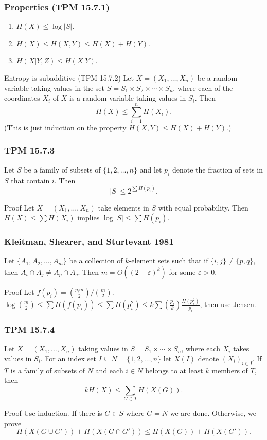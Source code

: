 \documentclass{beamer}
\newcommand{\lp}{\left(}
\newcommand{\rp}{\right)}
\begin{document}
\begin{frame}
  \frametitle{Properties (TPM 15.7.1)}
  \begin{enumerate}
    \item $H(X) \le \log |S|$. \pause
    \item $H(X) \le H(X, Y) \le H(X) + H(Y)$. \pause
    \item $H(X|Y, Z) \le H(X|Y)$. \pause
  \end{enumerate}

  \begin{block}{Entropy is subadditive (TPM 15.7.2)}
    Let $X = (X_1, \dotsc, X_n)$ be a random variable taking values in the set $S = S_1 \times S_2 \times \dotsb \times S_n$, where each of the coordinates $X_i$ of $X$ is a random variable taking values in $S_i$. Then \[ H(X) \le \sum_{i = 1}^n H(X_i). \] \pause (This is just induction on the property $H(X, Y) \le H(X) + H(Y)$.)
  \end{block}
\end{frame}

\begin{frame}
  \frametitle{TPM 15.7.3}
  Let $S$ be a family of subsets of $\{ 1, 2, \dotsc, n \}$ and let $p_i$ denote the fraction of sets in $S$ that contain $i$. Then \[ |S| \le 2^{\sum H(p_i)}. \] \pause

  \begin{block}{Proof}
    Let $X = (X_1, \dotsc, X_n)$ take elements in $S$ with equal probability. Then $H(X) \le \sum H(X_i)$ implies $\log |S| \le \sum H(p_i)$.
  \end{block}
\end{frame}

\begin{frame}
  \frametitle{Kleitman, Shearer, and Sturtevant 1981}
  Let $\{ A_1, A_2, \dotsc, A_m \}$ be a collection of $k$-element sets such that if $\{ i, j \} \ne \{ p, q \}$, then $A_i \cap A_j \ne A_p \cap A_q$. Then $m = O \lp (2 - \varepsilon)^k \rp$ for some $\varepsilon > 0$. \pause

  \begin{block}{Proof}
    Let $f(p_i) = \binom{p_im}{2} / \binom{m}{2}$. $\log \binom{m}{2} \le \sum H(f(p_i)) \le \sum H(p_i^2) \le k \sum \lp \frac{p_i}{k} \rp \frac{H(p_i^2)}{p_i}$, then use Jensen.
  \end{block}
\end{frame}

\begin{frame}
  \frametitle{TPM 15.7.4}
  Let $X = (X_1, \dotsc, X_n)$ taking values in $S = S_1 \times \dotsb \times S_n$, where each $X_i$ takes values in $S_i$. For an index set $I \subseteq N = \{ 1, 2, \dotsc, n \}$ let $X(I)$ denote $(X_i)_{i \in I}$. If $T$ is a family of subsets of $N$ and each $i \in N$ belongs to at least $k$ members of $T$, then \[ kH(X) \le \sum_{G \in T} H(X(G)). \] \pause

  \begin{block}{Proof}
    Use induction. If there is $G \in S$ where $G = N$ we are done. Otherwise, we prove \[ H(X(G \cup G')) + H(X(G \cap G')) \le H(X(G)) + H(X(G')). \]
  \end{block}
\end{frame}
\end{document}
